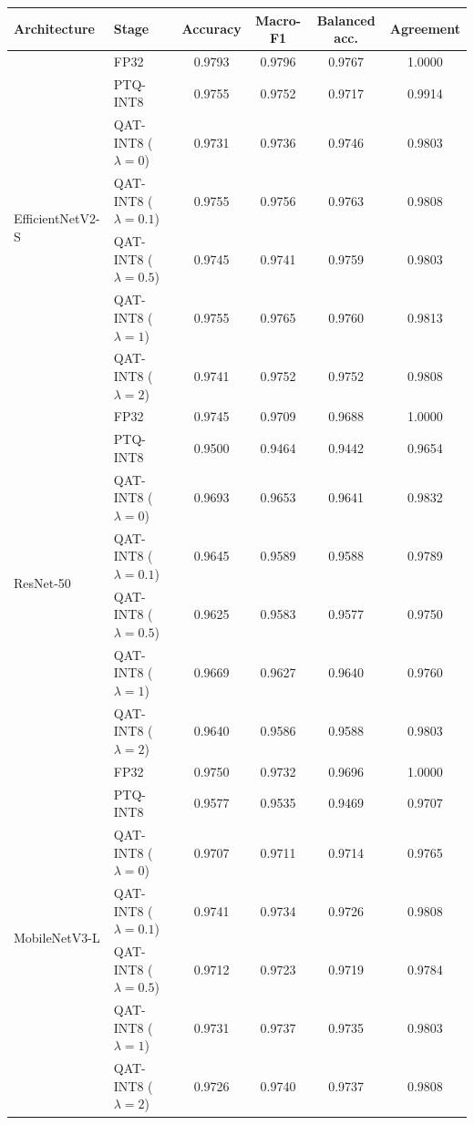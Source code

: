 \begin{tabular}{ll cccc}
\toprule
\textbf{Architecture} & \textbf{Stage} & \textbf{Accuracy} & \textbf{Macro-F1} & \textbf{Balanced acc.} & \textbf{Agreement} \\
\midrule
\multirow{7}{*}{EfficientNetV2-S}
 & FP32 & 0.9793 & 0.9796 & 0.9767 & 1.0000 \\
 & PTQ-INT8 & 0.9755 & 0.9752 & 0.9717 & 0.9914 \\
 & QAT-INT8 ($\lambda=0$) & 0.9731 & 0.9736 & 0.9746 & 0.9803 \\
 & QAT-INT8 ($\lambda=0.1$) & 0.9755 & 0.9756 & 0.9763 & 0.9808 \\
 & QAT-INT8 ($\lambda=0.5$) & 0.9745 & 0.9741 & 0.9759 & 0.9803 \\
 & QAT-INT8 ($\lambda=1$) & 0.9755 & 0.9765 & 0.9760 & 0.9813 \\
 & QAT-INT8 ($\lambda=2$) & 0.9741 & 0.9752 & 0.9752 & 0.9808 \\
\midrule
\multirow{7}{*}{ResNet-50}
 & FP32 & 0.9745 & 0.9709 & 0.9688 & 1.0000 \\
 & PTQ-INT8 & 0.9500 & 0.9464 & 0.9442 & 0.9654 \\
 & QAT-INT8 ($\lambda=0$) & 0.9693 & 0.9653 & 0.9641 & 0.9832 \\
 & QAT-INT8 ($\lambda=0.1$) & 0.9645 & 0.9589 & 0.9588 & 0.9789 \\
 & QAT-INT8 ($\lambda=0.5$) & 0.9625 & 0.9583 & 0.9577 & 0.9750 \\
 & QAT-INT8 ($\lambda=1$) & 0.9669 & 0.9627 & 0.9640 & 0.9760 \\
 & QAT-INT8 ($\lambda=2$) & 0.9640 & 0.9586 & 0.9588 & 0.9803 \\
\midrule
\multirow{7}{*}{MobileNetV3-L}
 & FP32 & 0.9750 & 0.9732 & 0.9696 & 1.0000 \\
 & PTQ-INT8 & 0.9577 & 0.9535 & 0.9469 & 0.9707 \\
 & QAT-INT8 ($\lambda=0$) & 0.9707 & 0.9711 & 0.9714 & 0.9765 \\
 & QAT-INT8 ($\lambda=0.1$) & 0.9741 & 0.9734 & 0.9726 & 0.9808 \\
 & QAT-INT8 ($\lambda=0.5$) & 0.9712 & 0.9723 & 0.9719 & 0.9784 \\
 & QAT-INT8 ($\lambda=1$) & 0.9731 & 0.9737 & 0.9735 & 0.9803 \\
 & QAT-INT8 ($\lambda=2$) & 0.9726 & 0.9740 & 0.9737 & 0.9808 \\
\bottomrule
\end{tabular}
